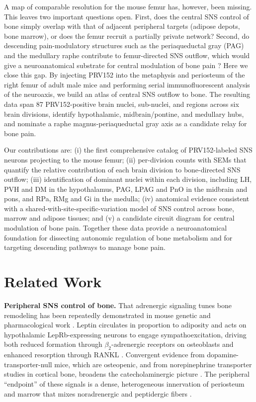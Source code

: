 A map of comparable resolution for the mouse femur has, however, been missing. This leaves two important questions open. First, does the central SNS control of bone simply overlap with that of adjacent peripheral targets (adipose depots, bone marrow), or does the femur recruit a partially private network? Second, do descending pain-modulatory structures such as the periaqueductal gray (PAG) and the medullary raphe contribute to femur-directed SNS outflow, which would give a neuroanatomical substrate for central modulation of bone pain \cite{francois2017brainstem,heinricher2009descending}? Here we close this gap. By injecting PRV152 into the metaphysis and periosteum of the right femur of adult male mice and performing serial immunofluorescent analysis of the neuroaxis, we build an atlas of central SNS outflow to bone. The resulting data span 87 PRV152-positive brain nuclei, sub-nuclei, and regions across six brain divisions, identify hypothalamic, midbrain/pontine, and medullary hubs, and nominate a raphe magnus-periaqueductal gray axis as a candidate relay for bone pain.

Our contributions are: (i) the first comprehensive catalog of PRV152-labeled SNS neurons projecting to the mouse femur; (ii) per-division counts with SEMs that quantify the relative contribution of each brain division to bone-directed SNS outflow; (iii) identification of dominant nuclei within each division, including LH, PVH and DM in the hypothalamus, PAG, LPAG and PnO in the midbrain and pons, and RPa, RMg and Gi in the medulla; (iv) anatomical evidence consistent with a shared-with-site-specific-variation model of SNS control across bone, marrow and adipose tissues; and (v) a candidate circuit diagram for central modulation of bone pain. Together these data provide a neuroanatomical foundation for dissecting autonomic regulation of bone metabolism and for targeting descending pathways to manage bone pain.

\section{Related Work}

\textbf{Peripheral SNS control of bone.} That adrenergic signaling tunes bone remodeling has been repeatedly demonstrated in mouse genetic and pharmacological work \cite{ducy2000leptin,takeda2002leptin,elefteriou2005leptin}. Leptin circulates in proportion to adiposity and acts on hypothalamic LepRb-expressing neurons to engage sympathoexcitation, driving both reduced formation through \(\beta_2\)-adrenergic receptors on osteoblasts and enhanced resorption through RANKL \cite{elefteriou2005leptin,flak2016cns}. Convergent evidence from dopamine-transporter-null mice, which are osteopenic, and from norepinephrine transporter studies in cortical bone, broadens the catecholaminergic picture \cite{bliziotes2000bone,zhu2018cortical}. The peripheral ``endpoint'' of these signals is a dense, heterogeneous innervation of periosteum and marrow that mixes noradrenergic and peptidergic fibers \cite{hohmann1986innervation,togari2010control}.

